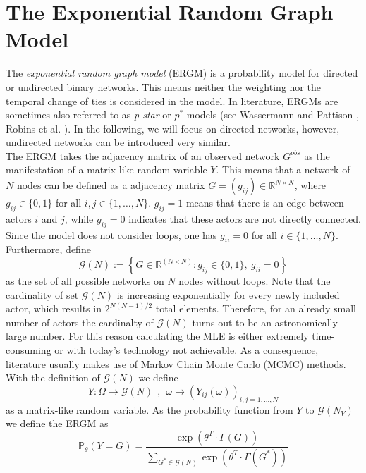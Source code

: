 \documentclass[headsepline=true, abstracton]{scrartcl}
\begin{document}
 \section*{The Exponential Random Graph Model}
The \textit{exponential random graph model} (ERGM) is a probability model for directed or undirected binary networks. This means neither the weighting nor the temporal change of ties is considered in the model.
In literature, ERGMs are sometimes also referred to as \textit{p-star} or $p^*$ models (see Wassermann and Pattison \cite{Wasserman.1996}, Robins et al. \cite{robins.pattison.2007}). In the following, we will focus on directed networks, however, undirected networks can be introduced very similar.\\[0.3cm] %
The ERGM takes the adjacency matrix of an observed network $G^{obs}$ as the manifestation of a matrix-like random variable $Y$. This means that a network of $N$ nodes can be defined as a adjacency matrix $G=(g_{ij})\in \mathbb{R}^{N \times N}$, where $g_{ij} \in \{0,1\}$ for all $i,j \in \{1,\dots , N\}$. $g_{ij}=1$ means that there is an edge between actors $i$ and $j$, while $g_{ij}=0$ indicates that these actors are not directly connected. Since the model does not consider loops, one has $g_{ii}=0$ for all $i \in \{1,\dots , N\}$. Furthermore, define
$$ \mathcal{G}(N) := \left\{ G \in \mathbb{R}^{(N \times N)}: g_{ij} \in \{0,1\},~g_{ii}=0\right\}$$
as the set of all possible networks on $N$ nodes without loops. Note that the cardinality of set $\mathcal{G}(N)$ is increasing exponentially for every newly included actor, which results in $2^{N(N-1)/2}$ total elements. Therefore, for an already small number of actors the cardinalty of $\mathcal{G}(N)$ turns out to be an astronomically large number. For this reason calculating the MLE is either extremely time-consuming or with today's technology not achievable. As a consequence, literature usually makes use of Markov Chain Monte Carlo (MCMC) methods.\\  
With the definition of $\mathcal{G}(N)$ we define 
$$Y: \Omega \to \mathcal{G}(N)~~,~~\omega \mapsto (Y_{ij}(\omega))_{i,j=1,\dots,N}$$
as a matrix-like random variable. As the probability function from $Y$ to $\mathcal{G}(N_V)$ we define the ERGM as
\begin{equation}
\mathbb{P}_{\theta}(Y=G)=\dfrac{\exp(\theta^T \cdot \Gamma(G))}{\sum_{G^* \in \mathcal{G}(N)} \exp(\theta^T \cdot \Gamma(G^*))} 
\label{ERGM}
\end{equation}
\end{document}
